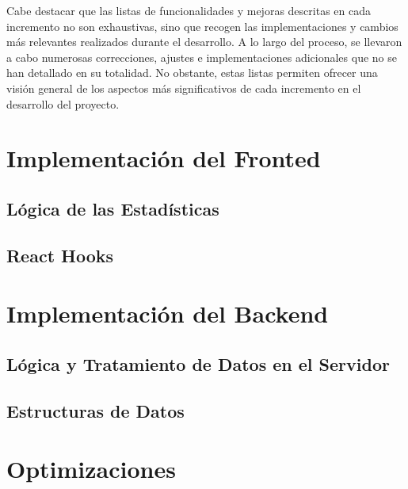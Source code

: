 Cabe destacar que las listas de funcionalidades y mejoras descritas en cada incremento no son exhaustivas, sino que recogen las implementaciones y cambios más relevantes realizados durante el desarrollo. A lo largo del proceso, se llevaron a cabo numerosas correcciones, ajustes e implementaciones adicionales que no se han detallado en su totalidad. No obstante, estas listas permiten ofrecer una visión general de los aspectos más significativos de cada incremento en el desarrollo del proyecto.

\section{Implementación del Fronted}

\subsection{Lógica de las Estadísticas}

\subsection{React Hooks}

\section{Implementación del Backend}

\subsection{Lógica y Tratamiento de Datos en el Servidor}

\subsection{Estructuras de Datos}

\section{Optimizaciones}